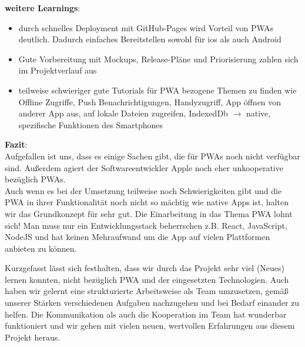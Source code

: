 \textbf{weitere Learnings}:
\begin{itemize}[noitemsep]
	\item durch schnelles Deployment mit GitHub-Pages wird Vorteil von PWAs deutlich. Dadurch einfaches Bereitstellen sowohl für ios als auch Android
	\item Gute Vorbereitung mit Mockups, Release-Pläne und Priorisierung zahlen sich im Projektverlauf aus
	\item teilweise schwieriger gute Tutorials für PWA bezogene Themen zu finden wie Offline Zugriffe, Push Benachrichtigungen, Handyzugriff, App öffnen von anderer App aus, auf lokale Dateien zugreifen, IndexedDb $\rightarrow$ native, spezifische Funktionen des Smartphones
\end{itemize}

\textbf{Fazit}:\\
Aufgefallen ist uns, dass es einige Sachen gibt, die für PWAs noch nicht verfügbar sind. Außerdem agiert der Softwareentwickler Apple noch eher unkooperative bezüglich PWAs.\\
Auch wenn es bei der Umsetzung teilweise noch Schwierigkeiten gibt und die PWA in ihrer Funktionalität noch nicht so mächtig wie native Apps ist, halten wir das Grundkonzept für sehr gut.
Die Einarbeitung in das Thema PWA lohnt sich! Man  muss nur ein Entwicklungsstack beherrschen z.B. React, JavaScript, NodeJS und hat keinen Mehraufwand um die App auf vielen Plattformen anbieten zu können.

Kurzgefasst lässt sich festhalten, dass wir durch das Projekt sehr viel (Neues) lernen konnten, nicht bezüglich PWA und der eingesetzten Technologien. Auch haben wir gelernt eine strukturierte Arbeitsweise als Team umzusetzen, gemäß unserer Stärken verschiedenen Aufgaben nachzugehen und bei Bedarf einander zu helfen. Die Kommunikation als auch die Kooperation im Team hat wunderbar funktioniert und wir gehen mit vielen neuen, wertvollen Erfahrungen aus diesem Projekt heraus. 

